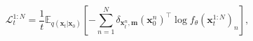 \begin{equation}
\label{eq:dm-loss}
    \mathcal{L}_{t}^{1:N} = \frac{1}{t}\mathbb{E}_{q(\mathbf{x}_t|\mathbf{x}_0)}\left[-\sum_{n=1}^N\delta_{\mathbf{x}_t^n,\bm{m}}(\mathbf{x}_0^{n})^\top\log f_{\theta}(\mathbf{x}_t^{1:N})_n\right],
\end{equation}